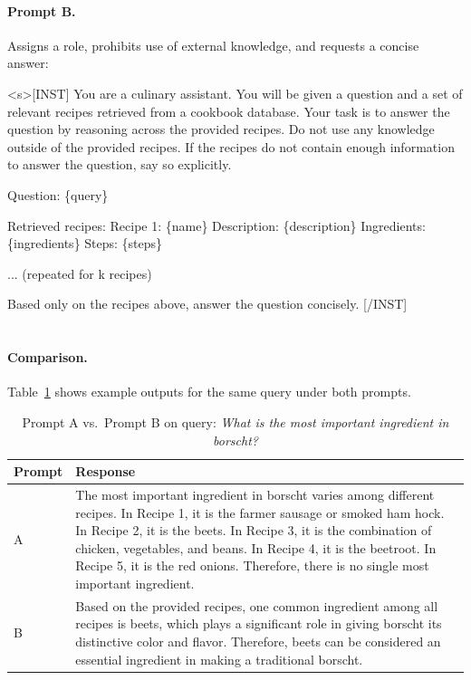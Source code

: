 \documentclass[a4paper,11pt]{article}
\begin{document}
\paragraph{Prompt B.}
Assigns a role, prohibits use of external knowledge, and requests a concise answer:

\begin{tcolorbox}[title=Prompt B, fontupper=\small\ttfamily, breakable]
<s>[INST] You are a culinary assistant. You will be given a question and a set of relevant recipes retrieved from a cookbook database. Your task is to answer the question by reasoning across the provided recipes. Do not use any knowledge outside of the provided recipes. If the recipes do not contain enough information to answer the question, say so explicitly.

Question: \{query\}

Retrieved recipes:
Recipe 1: \{name\}
Description: \{description\}
Ingredients: \{ingredients\}
Steps: \{steps\}

... (repeated for k recipes)

Based only on the recipes above, answer the question concisely. [/INST]
\end{tcolorbox}
\newpage
\paragraph{\\Comparison.}
Table~\ref{tab:prompt-comparison} shows example outputs for the same query under both prompts.

\begin{table}[h]
\centering
\caption{Prompt A vs.\ Prompt B on query: \textit{What is the most important ingredient in borscht?}}
\label{tab:prompt-comparison}
\begin{tabular}{p{} p{}}
\hline
\textbf{Prompt} & \textbf{Response} \\
\hline
A & The most important ingredient in borscht varies among different recipes. In Recipe 1, it is the farmer sausage or smoked ham hock. In Recipe 2, it is the beets. In Recipe 3, it is the combination of chicken, vegetables, and beans. In Recipe 4, it is the beetroot. In Recipe 5, it is the red onions. Therefore, there is no single most important ingredient. \\
\addlinespace
B & Based on the provided recipes, one common ingredient among all recipes is beets, which plays a significant role in giving borscht its distinctive color and flavor. Therefore, beets can be considered an essential ingredient in making a traditional borscht. \\
\hline
\end{tabular}
\end{table}
\end{document}
